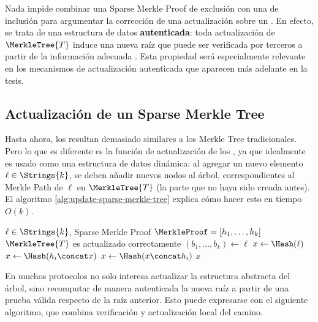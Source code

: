 Nada impide combinar una Sparse Merkle Proof de exclusión con una de inclusión para argumentar la corrección de una actualización sobre un \SMT. En efecto, se trata de una estructura de datos \textbf{autenticada}: toda actualización de $\MerkleTree{T}$ induce una nueva raíz que puede ser verificada por terceros a partir de la información adecuada \cite{Miller2014}. Esta propiedad será especialmente relevante en los mecanismos de actualización autenticada que aparecen más adelante en la tesis.

\subsection{Actualización de un Sparse Merkle Tree}

Hasta ahora, los \SMT resultan demasiado similares a los Merkle Tree tradicionales. Pero lo que es diferente es la función de actualización de los \SMT, ya que idealmente es usado como una estructura de datos dinámica: al agregar un nuevo elemento $\ell \in \Strings{k}$, se deben añadir nuevos nodos al árbol, correspondientes al Merkle Path de $\ell$ en $\MerkleTree{T}$ (la parte que no haya sido creada antes). El algoritmo \ref{alg:update-sparse-merkle-tree} explica cómo hacer esto en tiempo $O(k)$.


\begin{algorithm}[ht]
	\caption{Actualización de una hoja en un Sparse Merkle Tree}
	\label{alg:update-sparse-merkle-tree}
	\begin{algorithmic}[1]
		\Require $\ell \in \Strings{k}$, Sparse Merkle Proof $\MerkleProof = [h_1, \ldots, h_k]$
		\Ensure $\MerkleTree{T}$ es actualizado correctamente
		\State $(b_1, \ldots, b_k) \gets \ell$ 
		\State $x \gets \Hash(\ell)$
				\State $x \gets \Hash(h_i \concat x)$
			\Else
				\State $x \gets \Hash(x \concat h_i)$
			\EndIf
			\State {}
		\EndFor
		\State \Return $x$
	\end{algorithmic}
\end{algorithm}

En muchos protocolos no solo interesa actualizar la estructura abstracta del árbol, sino recomputar de manera autenticada la nueva raíz a partir de una prueba válida respecto de la raíz anterior. Esto puede expresarse con el siguiente algoritmo, que combina verificación y actualización local del camino.

